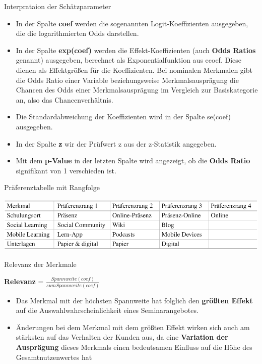 \documentclass[12pt,ngerman,a4paper,ignorenonframetext,]{beamer}
\providecommand{\tightlist}{%
  \setlength{\itemsep}{0pt}\setlength{\parskip}{0pt}}
\begin{document}
\begin{frame}{Interprataion der Schätzparameter}
\protect\hypertarget{interprataion-der-schatzparameter}{}

\begin{itemize}
\tightlist
\item
  In der Spalte \textbf{coef} werden die sogenannten Logit-Koeffizienten
  ausgegeben, die die logarithmierten Odds darstellen.
\item
  In der Spalte \textbf{exp(coef)} werden die Effekt-Koeffizienten (auch
  \textbf{Odds Ratios} genannt) ausgegeben, berechnet als
  Exponentialfunktion aus ecoef. Diese dienen als Effektgrößen für die
  Koeffizienten. Bei nominalen Merkmalen gibt die Odds Ratio einer
  Variable beziehungsweise Merkmalsausprägung die Chancen des Odds einer
  Merkmalsausprägung im Vergleich zur Basiskategorie an, also das
  Chancenverhältnis.
\item
  Die Standardabweichung der Koeffizienten wird in der Spalte se(coef)
  ausgegeben.
\item
  In der Spalte \textbf{z} wir der Prüfwert z aus der z-Statistik
  angegeben.
\item
  Mit dem \textbf{p-Value} in der letzten Spalte wird angezeigt, ob die
  \textbf{Odds Ratio} signifikant von 1 verschieden ist.
\end{itemize}

\end{frame}

\begin{frame}{Präferenztabelle mit Rangfolge}
\protect\hypertarget{praferenztabelle-mit-rangfolge}{}

\begin{center}\includegraphics[width=0.8\linewidth]{./images/Marketingcontrolling/Rangfolge} \end{center}

\end{frame}

\begin{frame}{Relevanz der Merkmale}
\protect\hypertarget{relevanz-der-merkmale}{}

\textbf{Relevanz} =
\(\frac{ Spannweite (coef) }{ sum Spannweite (coef) }\)

\begin{itemize}
\item
  Das Merkmal mit der höchsten Spannweite hat folglich den
  \textbf{größten Effekt} auf die Auswahlwahrscheinlichkeit eines
  Seminarangebotes.
\item
  Änderungen bei dem Merkmal mit dem größten Effekt wirken sich auch am
  stärksten auf das Verhalten der Kunden aus, da eine \textbf{Variation
  der Ausprägung} dieses Merkmals einen bedeutsamen Einfluss auf die
  Höhe des Gesamtnutzenwertes hat
\end{itemize}

\end{frame}
\end{document}
